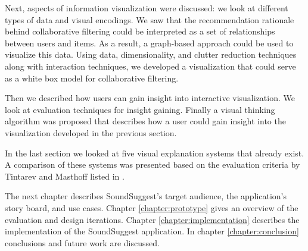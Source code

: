 Next, aspects of information visualization were discussed: we look at different types of data and visual encodings. We saw that the recommendation rationale behind collaborative filtering could be interpreted as a set of relationships between users and items. As a result, a graph-based approach could be used to visualize this data. Using data, dimensionality, and clutter reduction techniques along with interaction techniques, we developed a visualization that could serve as a white box model for collaborative filtering.

Then we described how users can gain insight into interactive visualization. We look at evaluation techniques for insight gaining. Finally a visual thinking algorithm was proposed that describes how a user could gain insight into the visualization developed in the previous section.

In the last section we looked at five visual explanation systems that already exist. A comparison of these systems was presented based on the evaluation criteria by Tintarev and Masthoff listed in \cite{tintarev:2007:SER:1547550.1547664}.

The next chapter describes SoundSuggest's target audience, the application's story board, and use cases. Chapter \ref{chapter:prototype} gives an overview of the evaluation and design iterations. Chapter \ref{chapter:implementation} describes the implementation of the SoundSuggest application. In chapter \ref{chapter:conclusion} conclusions and future work are discussed.





